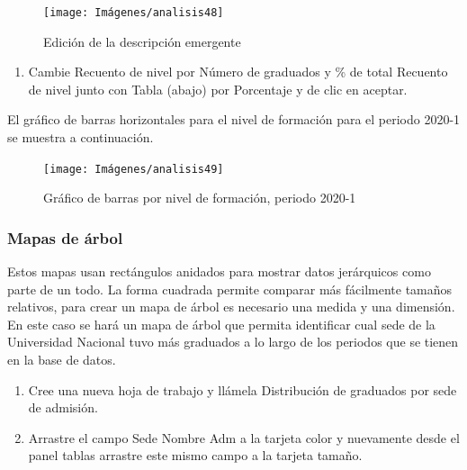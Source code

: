 \documentclass[
]{book}
\providecommand{\tightlist}{%
  \setlength{\itemsep}{0pt}\setlength{\parskip}{0pt}}
\begin{document}
\begin{figure}

{\centering \texttt{[image: Imágenes/analisis48]} 

}

\caption{Edición de la descripción emergente}\label{fig:paso12graficobarras-fig}
\end{figure}

\begin{enumerate}
\def\labelenumi{\arabic{enumi}.}
\setcounter{enumi}{12}
\tightlist
\item
  Cambie Recuento de nivel por Número de graduados y \% de total Recuento de nivel junto con Tabla (abajo) por Porcentaje y de clic en aceptar.
\end{enumerate}

El gráfico de barras horizontales para el nivel de formación para el periodo 2020-1 se muestra a continuación.

\begin{figure}

{\centering \texttt{[image: Imágenes/analisis49]} 

}

\caption{Gráfico de barras por nivel de formación, periodo 2020-1}\label{fig:graficobarras-fig}
\end{figure}

\hypertarget{mapasdearbol}{%
\subsubsection{Mapas de árbol}\label{mapasdearbol}}

Estos mapas usan rectángulos anidados para mostrar datos jerárquicos como parte de un todo. La forma cuadrada permite comparar más fácilmente tamaños relativos, para crear un mapa de árbol es necesario una medida y una dimensión. En este caso se hará un mapa de árbol que permita identificar cual sede de la Universidad Nacional tuvo más graduados a lo largo de los periodos que se tienen en la base de datos.

\begin{enumerate}
\def\labelenumi{\arabic{enumi}.}
\item
  Cree una nueva hoja de trabajo y llámela Distribución de graduados por sede de admisión.
\item
  Arrastre el campo Sede Nombre Adm a la tarjeta color y nuevamente desde el panel tablas arrastre este mismo campo a la tarjeta tamaño.
\end{enumerate}
\end{document}
